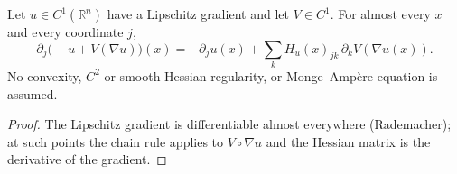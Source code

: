 \begin{lemma}
  \label{lem:ae-mongeampere-exponent}
  \leanok
  Let $u\in C^1(\mathbb R^n)$ have a Lipschitz gradient and let $V\in C^1$. For almost every $x$ and every coordinate $j$,
  \[
    \partial_j\bigl(-u+V(\nabla u)\bigr)(x)=-\partial_ju(x)+\sum_k H_u(x)_{jk}\,\partial_kV(\nabla u(x)).
  \]
  No convexity, $C^2$ or smooth-Hessian regularity, or Monge--Amp\`ere equation is assumed.
\end{lemma}
\begin{proof}
  \leanok
  The Lipschitz gradient is differentiable almost everywhere (Rademacher); at such points the chain rule applies to $V\circ\nabla u$ and
  the Hessian matrix is the derivative of the gradient.
\end{proof}

